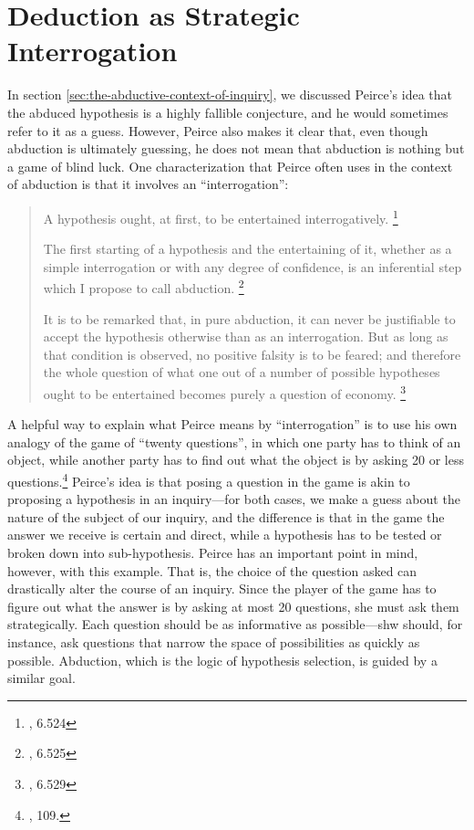 \section{Deduction as Strategic Interrogation}\label{strategicint}

In section \ref{sec:the-abductive-context-of-inquiry}, we discussed Peirce's idea that the abduced hypothesis is a highly fallible conjecture, and he would sometimes refer to it as a guess. However, Peirce also makes it clear that, even though abduction is ultimately guessing, he does not mean that abduction is nothing but a game of blind luck. One characterization that Peirce often uses in the context of abduction is that it involves an ``interrogation'':

\begin{quote}
	A hypothesis ought, at first, to be entertained interrogatively. \footnote{\cite{CP}, 6.524}
	
	The first starting of a hypothesis and the entertaining of it, whether as a simple interrogation or with any degree of confidence, is an inferential step which I propose to call abduction.	 \footnote{\cite{CP}, 6.525}
	
	It is to be remarked that, in pure abduction, it can never be justifiable to accept the hypothesis otherwise than as an interrogation. But as long as that condition is observed, no positive falsity is to be feared; and therefore the whole question of what one out of a number of possible hypotheses ought to be entertained becomes purely a question of economy.	\footnote{\cite{CP}, 6.529}
\end{quote}

A helpful way to explain what Peirce means by ``interrogation'' is to use his own analogy of the game of ``twenty questions'', in which one party has to think of an object, while another party has to find out what the object is by asking 20 or less questions.\footnote{\cite{essentialpeirce2}, 109.} Peirce's idea is that posing a question in the game is akin to proposing a hypothesis in an inquiry---for both cases, we make a guess about the nature of the subject of our inquiry, and the difference is that in the game the answer we receive is certain and direct, while a hypothesis has to be tested or broken down into sub-hypothesis. Peirce has an important point in mind, however, with this example. That is, the choice of the question asked can drastically alter the course of an inquiry. Since the player of the game has to figure out what the answer is by asking at most 20 questions, she must ask them strategically. Each question should be as informative as possible---shw should, for instance, ask questions that narrow the space of possibilities as quickly as possible. Abduction, which is the logic of hypothesis selection, is guided by a similar goal.


